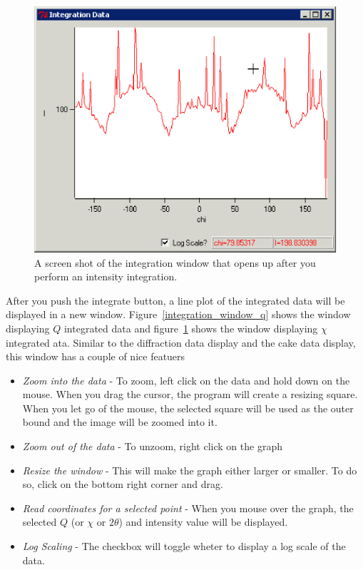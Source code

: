 \begin{figure}
\centering
\includegraphics[scale=.75]{figures/integration_window_chi.eps}
\caption{A screen shot of the integration window that
    opens up after you perform an intensity integration.} 
\label{integration_window_chi}
\end{figure}

After you push the integrate button, a line plot of the 
integrated data will be displayed in a new window. 
Figure~\ref{integration_window_q} shows 
the window displaying $Q$ integrated data
and figure~\ref{integration_window_chi} shows the
window displaying $\chi$ integrated ata.
Similar to the diffraction data display and the cake 
data display, this window has a couple of nice featuers
\begin{itemize}
    \item {\em Zoom into the data} - To zoom, left click
    on the data and hold down on the mouse. When you drag 
    the cursor, the program will create a resizing square. 
    When you let go of the mouse, the selected square will 
    be used as the outer bound and the image will be zoomed 
    into it. 
    \item {\em Zoom out of the data} - To unzoom, right
    click on the graph
    \item {\em Resize the window} - This will make the graph
    either larger or smaller. To do so, click on the bottom 
    right corner and drag. 
    \item {\em Read coordinates for a selected point} -
    When you mouse over the graph, the selected $Q$ (or $\chi$
    or $2\theta$) and intensity value will be displayed.
    \item {\em Log Scaling} - The  checkbox
    will toggle wheter to display a log scale of the data.
\end{itemize}

